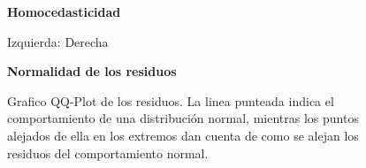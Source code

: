 \begin{figure}[H]
	\centering
	\textbf{Homocedasticidad}\par\medskip

	\caption[Homocedasticidad]{Izquierda: Derecha}\label{fig11}
\end{figure}




\begin{figure}[H]
	\centering
	\textbf{Normalidad de los residuos}\par\medskip
	\caption{Grafico QQ-Plot de los residuos. La linea punteada indica el comportamiento de una distribución normal, mientras los puntos alejados de ella en los extremos dan cuenta de como se alejan los residuos del comportamiento normal.}
\end{figure}\label{fig12}


